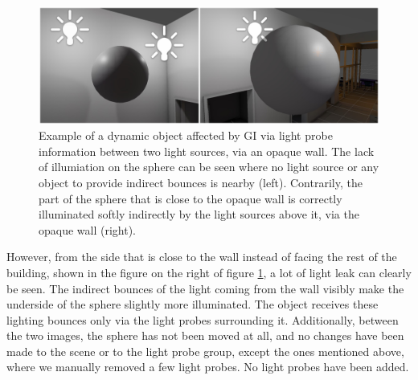 \begin{figure}[h]
	\centering
	\includegraphics[width=\linewidth]{Graphics/results/tests/office_ab.png}
	\caption{Example of a dynamic object affected by GI via light probe information between two light sources, via an opaque wall. The lack of illumiation on the sphere can be seen where no light source or any object to provide indirect bounces is nearby (left). Contrarily, the part of the sphere that is close to the opaque wall is correctly illuminated softly indirectly by the light sources above it, via the opaque wall (right).}
	\label{fig:office_test_a}
\end{figure}

However, from the side that is close to the wall instead of facing the rest of the building, shown in the figure on the right of figure \ref{fig:office_test_a}, a lot of light leak can clearly be seen. The indirect bounces of the light coming from the wall visibly make the underside of the sphere slightly more illuminated. The object receives these lighting bounces only via the light probes surrounding it. Additionally, between the two images, the sphere has not been moved at all, and no changes have been made to the scene or to the light probe group, except the ones mentioned above, where we manually removed a few light probes. No light probes have been added.\newline

